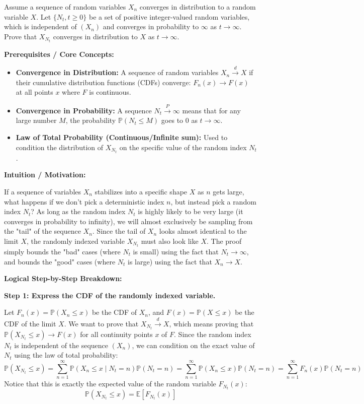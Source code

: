 \begin{exercise}\label{probability:2015:7}
Assume a sequence of random variables $X_n$ converges in distribution to a random variable $X$. Let $\{N_t, t \geq 0\}$ be a set of positive integer-valued random variables, which is independent of $(X_n)$ and converges in probability to $\infty$ as $t \to \infty$. Prove that $X_{N_t}$ converges in distribution to $X$ as $t \to \infty$.
\end{exercise}

\begin{solution}
\textbf{Prerequisites / Core Concepts:}
\begin{itemize}
    \item \textbf{Convergence in Distribution:} A sequence of random variables $X_n \xrightarrow{d} X$ if their cumulative distribution functions (CDFs) converge: $F_n(x) \to F(x)$ at all points $x$ where $F$ is continuous.
    \item \textbf{Convergence in Probability:} A sequence $N_t \xrightarrow{P} \infty$ means that for any large number $M$, the probability $\mathbb{P}(N_t \leq M)$ goes to $0$ as $t \to \infty$.
    \item \textbf{Law of Total Probability (Continuous/Infinite sum):} Used to condition the distribution of $X_{N_t}$ on the specific value of the random index $N_t$.
\end{itemize}

\textbf{Intuition / Motivation:}

If a sequence of variables $X_n$ stabilizes into a specific shape $X$ as $n$ gets large, what happens if we don't pick a deterministic index $n$, but instead pick a random index $N_t$? As long as the random index $N_t$ is highly likely to be very large (it converges in probability to infinity), we will almost exclusively be sampling from the "tail" of the sequence $X_n$. Since the tail of $X_n$ looks almost identical to the limit $X$, the randomly indexed variable $X_{N_t}$ must also look like $X$. The proof simply bounds the "bad" cases (where $N_t$ is small) using the fact that $N_t \to \infty$, and bounds the "good" cases (where $N_t$ is large) using the fact that $X_n \to X$.

\textbf{Logical Step-by-Step Breakdown:}

\textbf{Step 1: Express the CDF of the randomly indexed variable.}

Let $F_n(x) = \mathbb{P}(X_n \leq x)$ be the CDF of $X_n$, and $F(x) = \mathbb{P}(X \leq x)$ be the CDF of the limit $X$.
We want to prove that $X_{N_t} \xrightarrow{d} X$, which means proving that $\mathbb{P}(X_{N_t} \leq x) \to F(x)$ for all continuity points $x$ of $F$.
Since the random index $N_t$ is independent of the sequence $(X_n)$, we can condition on the exact value of $N_t$ using the law of total probability:
\[ \mathbb{P}(X_{N_t} \leq x) = \sum_{n=1}^\infty \mathbb{P}(X_n \leq x \mid N_t = n) \mathbb{P}(N_t = n) = \sum_{n=1}^\infty \mathbb{P}(X_n \leq x) \mathbb{P}(N_t = n) = \sum_{n=1}^\infty F_n(x) \mathbb{P}(N_t = n) \]
Notice that this is exactly the expected value of the random variable $F_{N_t}(x)$:
\[ \mathbb{P}(X_{N_t} \leq x) = \mathbb{E}[F_{N_t}(x)] \]


\end{solution}

